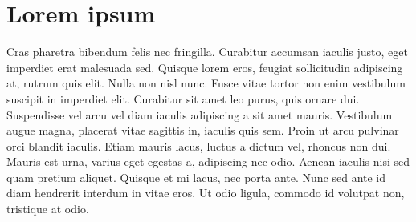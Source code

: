 \chapter{Lorem ipsum}
\label{section:appendix1}

Cras pharetra bibendum felis nec fringilla. Curabitur accumsan iaculis justo,
eget imperdiet erat malesuada sed. Quisque lorem eros, feugiat sollicitudin
adipiscing at, rutrum quis elit. Nulla non nisl nunc. Fusce vitae tortor non
enim vestibulum suscipit in imperdiet elit. Curabitur sit amet leo purus, quis
ornare dui. Suspendisse vel arcu vel diam iaculis adipiscing a sit amet mauris.
Vestibulum augue magna, placerat vitae sagittis in, iaculis quis sem. Proin ut
arcu pulvinar orci blandit iaculis. Etiam mauris lacus, luctus a dictum vel,
rhoncus non dui. Mauris est urna, varius eget egestas a, adipiscing nec odio.
Aenean iaculis nisi sed quam pretium aliquet. Quisque et mi lacus, nec porta
ante. Nunc sed ante id diam hendrerit interdum in vitae eros. Ut odio ligula,
commodo id volutpat non, tristique at odio.

